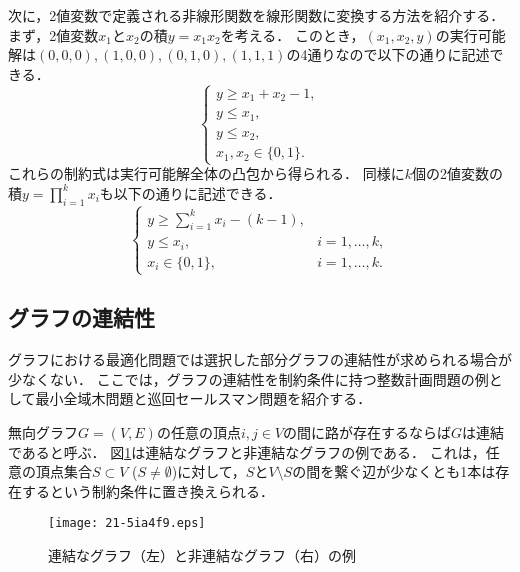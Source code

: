 \documentclass[japanese]{jnlp_1.4}
\begin{document}
次に，2値変数で定義される非線形関数を線形関数に変換する方法を紹介する．
まず，2値変数$x_1$と$x_2$の積$y= x_1 x_2$を考える．
このとき，$(x_1,x_2,y)$の実行可能解は$(0,0,0), \allowbreak (1,0,0), \allowbreak (0,1,0), \allowbreak (1,1,1)$の4通りなので以下の通りに記述できる．
\begin{equation}
\left\{
\begin{array}{l}
y \ge x_1 + x_2 - 1,\\
y \le x_1, \\
y \le x_2,\\
x_1, x_2 \in \{ 0,1 \}.
\end{array}
\right.
\end{equation}
これらの制約式は実行可能解全体の凸包から得られる．
同様に$k$個の2値変数の積$y=\prod_{i=1}^k x_i$も以下の通りに記述できる．
\begin{equation}
\left\{
\begin{array}{ll}
y \ge \displaystyle\sum_{i=1}^k x_i - (k-1), & \\
y \le x_i, & i=1,\dots,k,\\
x_i \in \{ 0,1 \}, & i=1,\dots,k.
\end{array}
\right.
\end{equation}


\subsection{グラフの連結性}
\label{sec:connectivity}

グラフにおける最適化問題では選択した部分グラフの連結性が求められる場合が少なくない．
ここでは，グラフの連結性を制約条件に持つ整数計画問題の例として最小全域木問題と巡回セールスマン問題を紹介する．


無向グラフ$G=(V,E)$の任意の頂点$i,j \in V$の間に路が存在するならば$G$は連結であると呼ぶ．
図\ref{fig:connect}は連結なグラフと非連結なグラフの例である．
これは，任意の頂点集合$S \subset V$ ($S \not= \emptyset$)に対して，$S$と$V \setminus S$の間を繋ぐ辺が少なくとも1本は存在するという制約条件に置き換えられる．

\begin{figure}[b]
\begin{center}
\texttt{[image: 21-5ia4f9.eps]}
\end{center}
\caption{連結なグラフ（左）と非連結なグラフ（右）の例}
\label{fig:connect}
\end{figure}
\end{document}
